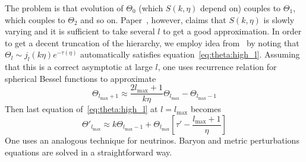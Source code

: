 \documentclass[12pt]{extarticle}
\numberwithin{problem}{section}
\numberwithin{theorem}{section}
\begin{document}
	The problem is that evolution of $\Theta_0$ (which $S(k, \eta)$ depend on) couples to $\Theta_1$, which couples to $\Theta_2$ and so on. Paper~\cite{seljak:1996}, however, claims that $S(k, \eta)$ is slowly varying and it is sufficient to take several $l$ to get a good approximation. In order to get a decent truncation of the hierarchy, we employ idea from~\cite{ma:1995} by noting that $\Theta_l\sim j_l(k\eta)e^{-\tau(\eta)}$ automatically satisfies equation~\ref{eq:theta:high_l}. Assuming that this is a correct asymptotic at large $l$, one uses recurrence relation for spherical Bessel functions to approximate
	\begin{equation}
		\Theta_{l_{\max} + 1}\approx \frac{2l_{\max} + 1}{k\eta}\Theta_{l_{\max}} - \Theta_{l_{\max} - 1}
	\end{equation}
	Then last equation of~\ref{eq:theta:high_l} at $l = l_{\max}$ becomes
	\begin{equation}
		\Theta'_{l_{\max}}\approx k\Theta_{l_{\max} - 1} + \Theta_{l_{\max}}\left[\tau' - \frac{l_{\max} + 1}{\eta}\right]
	\end{equation}
	One uses an analogous technique for neutrinos. Baryon and metric perturbations equations are solved in a straightforward way.
	
	
	
\end{document}
